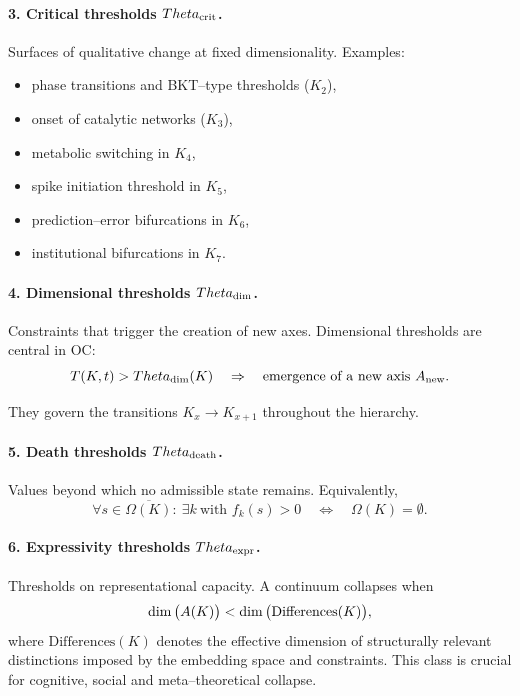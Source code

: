 \paragraph{3. Critical thresholds \(\Theta_{\rm crit}\).}
Surfaces of qualitative change at fixed dimensionality.
Examples:
\begin{itemize}
    \item phase transitions and BKT–type thresholds (\(K_2\)),
    \item onset of catalytic networks (\(K_3\)),
    \item metabolic switching in \(K_4\),
    \item spike initiation threshold in \(K_5\),
    \item prediction–error bifurcations in \(K_6\),
    \item institutional bifurcations in \(K_7\).
\end{itemize}

\paragraph{4. Dimensional thresholds \(\Theta_{\rm dim}\).}
Constraints that trigger the creation of new axes.
Dimensional thresholds are central in OC:
\[
   T(K,t) > \Theta_{\rm dim}(K)
   \quad\Rightarrow\quad
   \text{emergence of a new axis } A_{\rm new}.
\]

They govern the transitions \(K_x \to K_{x+1}\) throughout the hierarchy.

\paragraph{5. Death thresholds \(\Theta_{\rm death}\).}
Values beyond which no admissible state remains. Equivalently,
\[
   \forall s\in\overline{\Omega(K)}:\ \exists k\ \text{with } f_k(s) > 0
   \quad\Longleftrightarrow\quad
   \Omega(K)=\emptyset.
\]

\paragraph{6. Expressivity thresholds \(\Theta_{\rm expr}\).}
Thresholds on representational capacity. A continuum collapses when
\[
   \dim\big(A(K)\big)
   <
   \dim\big({\rm Differences}(K)\big),
\]
where \(\mathrm{Differences}(K)\) denotes the effective dimension of
structurally relevant distinctions imposed by the embedding space and
constraints. This class is crucial for cognitive, social and meta–theoretical
collapse.

